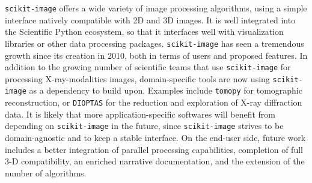 \documentclass[twocolumn]{bmcart}%
\begin{document}
\texttt{scikit-image} offers a wide variety of image processing
algorithms, using a simple interface natively compatible with 2D and 3D
images. It is well integrated into the Scientific Python ecosystem, so
that it interfaces well with visualization libraries or other data
processing packages. \texttt{scikit-image} has seen a tremendous growth
since its creation in 2010, both in terms of users and proposed features.
In addition to the growing number of scientific teams that use
\texttt{scikit-image} for processing X-ray-modalities images,
domain-specific tools are now using \texttt{scikit-image} as a dependency
to build upon. Examples include \texttt{tomopy} \citep{Gursoy2014} for
tomographic reconstruction, or \texttt{DIOPTAS} \citep{Prescher2015} for
the reduction and exploration of X-ray diffraction data. It is likely
that more application-specific softwares will benefit from depending on
\texttt{scikit-image} in the future, since \texttt{scikit-image} strives
to be domain-agnostic and to keep a stable interface. On the end-user
side, future work includes a better integration of parallel processing
capabilities, completion of full 3-D compatibility, an enriched narrative
documentation, and the extension of the number of algorithms.

\end{document}
